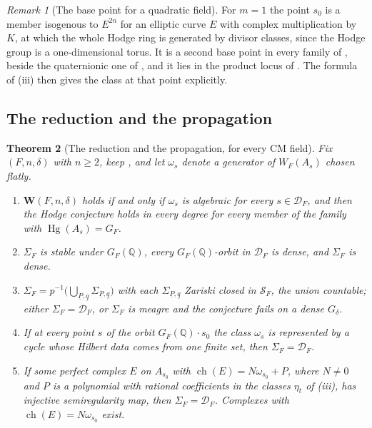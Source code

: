 \documentclass[11pt,reqno]{amsart}
\theoremstyle{plain}
\newtheorem{theorem}{Theorem}[section]
\theoremstyle{definition}
\theoremstyle{remark}
\newtheorem{remark}[theorem]{Remark}
\newcommand{\QQ}{\mathbb{Q}}
\newcommand{\cD}{\mathcal{D}}
\newcommand{\cS}{\mathcal{S}}
\DeclareMathOperator{\ch}{ch}
\DeclareMathOperator{\Hg}{Hg}
\begin{document}
\begin{remark}[The base point for a quadratic field]\label{rem:cmquadratic}
For $m=1$ the point $s_{0}$ is a member isogenous to $E^{2n}$ for an elliptic
curve $E$ with complex multiplication by $K$, at which the whole Hodge ring
is generated by divisor classes, since the Hodge group is a one-dimensional
torus. It is a second base point in every family of ,
beside the quaternionic one of , and it lies in the
product locus of . The formula of
(iii) then gives the class at that point explicitly.
\end{remark}

\subsection{The reduction and the propagation}\label{ssec:cmpropagation}

\begin{theorem}[The reduction and the propagation, for every CM field]
\label{thm:cmpropagation}
Fix $(F,n,\delta)$ with $n\ge2$, keep , and let
$\omega_{s}$ denote a generator of $W_{F}(A_{s})$ chosen flatly.
\begin{enumerate}[label=\textup{(\roman*)},leftmargin=2.6em,itemsep=2pt]
\item $\mathbf{W}(F,n,\delta)$ holds if and only if $\omega_{s}$ is algebraic
  for every $s\in\cD_{F}$, and then the Hodge conjecture holds in every
  degree for every member of the family with $\Hg(A_{s})=G_{F}$.
\item $\Sigma_{F}$ is stable under $G_{F}(\QQ)$, every $G_{F}(\QQ)$-orbit in
  $\cD_{F}$ is dense, and $\Sigma_{F}$ is dense.
\item $\Sigma_{F}=p^{-1}\bigl(\bigcup_{\underline{P},\underline{q}}
  \Sigma_{\underline{P},\underline{q}}\bigr)$ with each
  $\Sigma_{\underline{P},\underline{q}}$ Zariski closed in $\cS_{F}$, the
  union countable; either $\Sigma_{F}=\cD_{F}$, or $\Sigma_{F}$ is meagre and
  the conjecture fails on a dense $G_{\delta}$.
\item If at every point $s$ of the orbit $G_{F}(\QQ)\cdot s_{0}$ the class
  $\omega_{s}$ is represented by a cycle whose Hilbert data comes from one
  finite set, then $\Sigma_{F}=\cD_{F}$.
\item If some perfect complex $E$ on $A_{s_{0}}$ with
  $\ch(E)=N\omega_{s_{0}}+P$, where $N\ne0$ and $P$ is a polynomial with
  rational coefficients in the classes $\eta_{t}$ of
  (iii), has injective semiregularity map, then
  $\Sigma_{F}=\cD_{F}$. Complexes with $\ch(E)=N\omega_{s_{0}}$ exist.
\end{enumerate}
\end{theorem}
\end{document}
